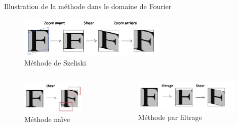 \documentclass[c,12pt]{beamer}
\newcommand{\image}[2]{\begin{figure} \texttt{[image: \#2]}\end{figure}}
\newcommand{\fram}[2]{\begin{frame} \frametitle{#1} #2 \end{frame}}
\begin{document}
\begin{frame}{Illustration de la méthode dans le domaine de Fourier }

\begin{figure}
\centering
\includegraphics[width=7cm]{fourier1.jpg}
\caption{Méthode de Szeliski}
\end{figure}

\begin{columns}
\begin{column}{4cm}

\begin{figure}
\centering
\includegraphics[width=3cm]{fourier2.jpg}
\caption{Méthode naïve}
\end{figure}


\end{column}

\begin{column}{6cm}

\begin{figure}
\centering
\includegraphics[width=5cm]{fourier3.jpg}
\caption{Méthode par filtrage}
\end{figure}


\end{column}
\end{columns}

\end{frame}
 
\end{document}
